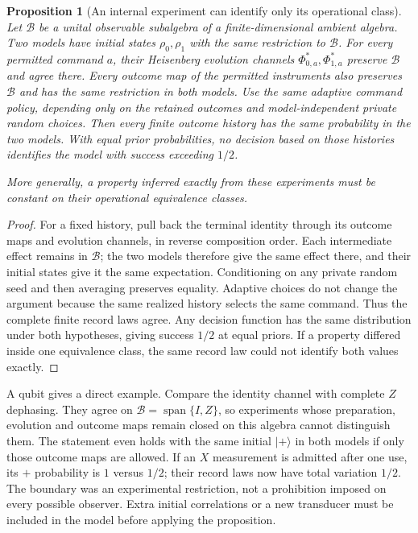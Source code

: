 \documentclass[12pt,a4paper]{article}
\newtheorem{proposition}[theorem]{Proposition}
\begin{document}
\begin{proposition}[An internal experiment can identify only its operational class]
\label{prop:operational-class}
Let $\mathcal B$ be a unital observable subalgebra of a finite-dimensional
ambient algebra. Two models have initial states $\rho_0,\rho_1$ with
the same restriction to $\mathcal B$. For every permitted command $a$,
their Heisenberg evolution channels $\Phi_{0,a}^*,\Phi_{1,a}^*$ preserve
$\mathcal B$ and agree there. Every outcome map of the permitted
instruments also preserves $\mathcal B$ and has the same restriction in
both models. Use the same adaptive command policy, depending only on
the retained outcomes and model-independent private random choices.
Then every finite outcome history has the same probability in the two
models. With equal prior probabilities, no decision based on those
histories identifies the model with success exceeding $1/2$.

More generally, a property inferred exactly from these experiments must
be constant on their operational equivalence classes.
\end{proposition}
\begin{proof}
For a fixed history, pull back the terminal identity through its
outcome maps and evolution channels, in reverse composition order.
Each intermediate effect remains in $\mathcal B$; the two models
therefore give the same effect there, and their initial states give it
the same expectation. Conditioning on any private random seed and then
averaging preserves equality. Adaptive choices do not change the
argument because the same realized history selects the same command.
Thus the complete finite record laws agree. Any decision function has
the same distribution under both hypotheses, giving success $1/2$
at equal priors. If a property differed inside one equivalence class,
the same record law could not identify both values exactly.
\end{proof}

A qubit gives a direct example. Compare the identity channel with complete
$Z$ dephasing. They agree on
$\mathcal B=\operatorname{span}\{I,Z\}$, so experiments whose preparation,
evolution and outcome maps remain closed on this algebra cannot
distinguish them. The statement even holds with the same initial
$|+\rangle$ in both models if only those outcome maps are allowed.
If an $X$ measurement is admitted after one use, its $+$ probability
is $1$ versus $1/2$; their record laws now have total variation $1/2$.
The boundary was an experimental restriction, not a prohibition imposed
on every possible observer. Extra initial correlations or a new
transducer must be included in the model before applying the proposition.
\end{document}
